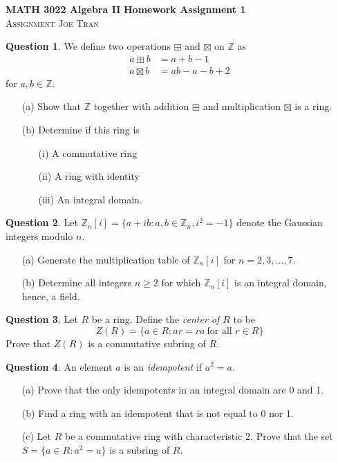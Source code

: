 \documentclass[11pt]{amsart}
\theoremstyle{definition}\newtheorem{question}{Question}
\theoremstyle{definition}\newtheorem*{solution}{Solution}
\newcommand{\Z}{\mathbb{Z}}
\begin{document}
\noindent \textbf{MATH 3022 Algebra II} \hfill \textbf{Homework Assignment 1} \\
\textsc{Assignment} \hfill \textsc{Joe Tran}

\begin{question}\label{question:1}
    We define two operations $\boxplus$ and $\boxtimes$ on $\Z$ as
    \begin{align*}
        a \boxplus b &= a + b - 1 \\
        a \boxtimes b &= ab - a - b + 2
    \end{align*}
    for $a, b \in \Z$.
    \begin{itemize}
        \item[(a)] Show that $\Z$ together with addition $\boxplus$ and multiplication $\boxtimes$ is a ring.
        \item[(b)] Determine if this ring is
        \begin{itemize}
            \item[(i)] A commutative ring
            \item[(ii)] A ring with identity
            \item[(iii)] An integral domain.
        \end{itemize}
    \end{itemize}
\end{question}

\begin{question}
    Let $\Z_n[i] = \{a + ib : a, b \in \Z_n, i^2 = -1\}$ denote the Gaussian integers modulo $n$.
    \begin{itemize}
        \item[(a)] Generate the multiplication table of $\Z_n[i]$ for $n = 2, 3, ..., 7$.
        \item[(b)] Determine all integers $n \geq 2$ for which $\Z_n[i]$ is an integral domain, hence, a field.
    \end{itemize}
\end{question}

\begin{question}
    Let $R$ be a ring. Define the \emph{center of $R$} to be
    \begin{equation*}
        Z(R) = \{a \in R : ar = ra \ \text{for all $r \in R$}\}
    \end{equation*}
    Prove that $Z(R)$ is a commutative subring of $R$.
\end{question}

\begin{question}
    An element $a$ is an \emph{idempotent} if $a^2 = a$.
    \begin{itemize}
        \item[(a)] Prove that the only idempotents in an integral domain are 0 and 1.
        \item[(b)] Find a ring with an idempotent that is not equal to 0 nor 1.
        \item[(c)] Let $R$ be a commutative ring with characteristic 2. Prove that the set $S = \{a \in R : a^2 = a\}$ is a subring of $R$.
    \end{itemize}
\end{question}
\end{document}
